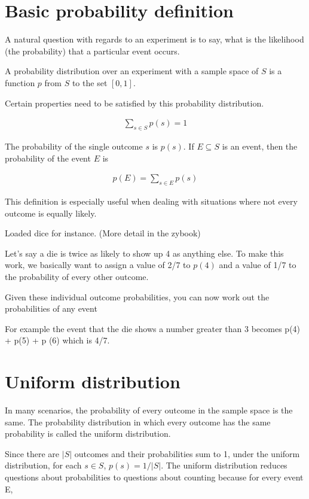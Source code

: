 \documentclass[12pt]{article}
\begin{document}
\section*{Basic probability definition}
A natural question with regards to an experiment is to say, what is the likelihood (the probability) that a particular event occurs.

A probability distribution over an experiment with a sample space of $S$ is a function $p$ from $S$ to the set $[0,1]$.

Certain properties need to be satisfied by this probability distribution.

\begin{align*}
\sum_{s \in S} p(s) = 1
\end{align*}

The probability of the single outcome $s$ is $p(s)$. If $E \subseteq S$ is an event, then the probability of the event $E$ is  

\begin{align*}
p(E) = \sum_{s \in E} p(s) 
\end{align*}

This definition is especially useful when dealing with situations where not every outcome is equally likely. 

Loaded dice for instance. (More detail in the zybook)

Let's say a die is twice as likely to show up 4 as anything else. To make this work, we basically want to assign a value of 2/7 to $p(4)$ and a value of 1/7 to the probability of every other outcome.

Given these individual outcome probabilities, you can now work out the probabilities of any event

For example the event that the die shows a number greater than 3 becomes p(4) + p(5) + p (6) which is 4/7.

\section*{Uniform distribution}

In many scenarios, the probability of every outcome in the sample space is the same. The probability distribution in which every outcome has the same probability is called the uniform distribution. 

Since there are $|S|$ outcomes and their probabilities sum to 1, under the uniform distribution, for each $s \in S$, $p(s) = 1/|S|$. The uniform distribution reduces questions about probabilities to questions about counting because for every event E,
\end{document}
